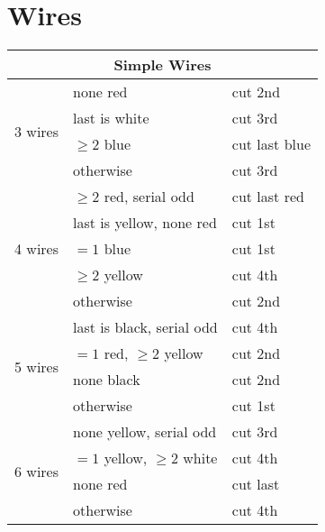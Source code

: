 \documentclass[11pt]{amsart}
\begin{document}
\section{Wires}

\begin{tabular}{|l|l|l|}
\hline
\multicolumn{3}{|c|}{Simple Wires} \\
\hline
\multirow{4}{*}{3 wires} & none red                    & cut 2nd \\
                         & last is white               & cut 3rd \\
                         & $\ge 2$ blue                & cut last blue \\
                         & otherwise                   & cut 3rd \\
\hline
\multirow{5}{*}{4 wires} & $\ge 2$ red, serial odd     & cut last red \\
                         & last is yellow, none red    & cut 1st \\
                         & $= 1$ blue                  & cut 1st \\
                         & $\ge 2$ yellow              & cut 4th \\
                         & otherwise                   & cut 2nd \\
\hline
\multirow{4}{*}{5 wires} & last is black, serial odd   & cut 4th \\
                         & $= 1$ red, $\ge 2$ yellow   & cut 2nd \\
                         & none black                  & cut 2nd \\
                         & otherwise                   & cut 1st \\
\hline
\multirow{4}{*}{6 wires} & none yellow, serial odd     & cut 3rd \\
                         & $= 1$ yellow, $\ge 2$ white & cut 4th \\
                         & none red                    & cut last \\
                         & otherwise                   & cut 4th \\
\hline
\end{tabular}
\end{document}
